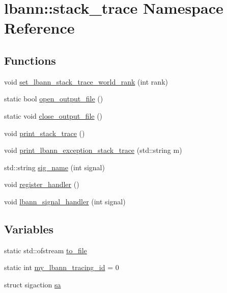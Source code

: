 \hypertarget{namespacelbann_1_1stack__trace}{}\section{lbann\+:\+:stack\+\_\+trace Namespace Reference}
\label{namespacelbann_1_1stack__trace}
\subsection*{Functions}
\begin{DoxyCompactItemize}
\item 
void \hyperlink{namespacelbann_1_1stack__trace_a1063a9a501d78a7525224461e155a483}{set\+\_\+lbann\+\_\+stack\+\_\+trace\+\_\+world\+\_\+rank} (int rank)
\item 
static bool \hyperlink{namespacelbann_1_1stack__trace_aa071d75a81128e2a8100d66529482842}{open\+\_\+output\+\_\+file} ()
\item 
static void \hyperlink{namespacelbann_1_1stack__trace_a45e4398bd4d0a7b9956107192a342b89}{close\+\_\+output\+\_\+file} ()
\item 
void \hyperlink{namespacelbann_1_1stack__trace_a52adbb11fce7541e2bc34b712d09e868}{print\+\_\+stack\+\_\+trace} ()
\item 
void \hyperlink{namespacelbann_1_1stack__trace_ae7396b3b0ee5d087a045f04ce690cae4}{print\+\_\+lbann\+\_\+exception\+\_\+stack\+\_\+trace} (std\+::string m)
\item 
std\+::string \hyperlink{namespacelbann_1_1stack__trace_a22d63f8c305ad282df5af296d61639e6}{sig\+\_\+name} (int signal)
\item 
void \hyperlink{namespacelbann_1_1stack__trace_a12c3aa60ec15015b925249fc61352f07}{register\+\_\+handler} ()
\item 
void \hyperlink{namespacelbann_1_1stack__trace_a4bf58556b9c42ac8930c273a921172de}{lbann\+\_\+signal\+\_\+handler} (int signal)
\end{DoxyCompactItemize}
\subsection*{Variables}
\begin{DoxyCompactItemize}
\item 
static std\+::ofstream \hyperlink{namespacelbann_1_1stack__trace_a6c838c74fec7cc57e5ccad283a8d282b}{to\+\_\+file}
\item 
static int \hyperlink{namespacelbann_1_1stack__trace_a78efe186260936105751e65f56c381d7}{my\+\_\+lbann\+\_\+tracing\+\_\+id} = 0
\item 
struct sigaction \hyperlink{namespacelbann_1_1stack__trace_a4a87ea956ec9344d4432f5e7d3dd445e}{sa}
\end{DoxyCompactItemize}


